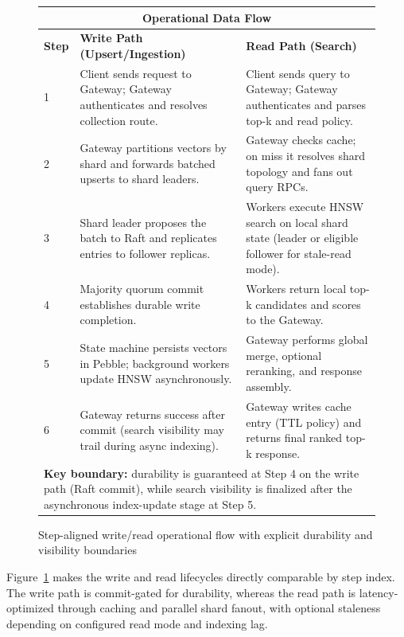 \documentclass[conference]{IEEEtran}
\begin{document}
\begin{figure}[t]
\centering
\footnotesize
\setlength{\tabcolsep}{5pt}
\renewcommand{\arraystretch}{1.20}
\begin{tabular}{|p{}|p{}|p{}|}
\hline
\multicolumn{3}{|c|}{\textbf{Operational Data Flow}} \\
\hline
\textbf{Step} & \textbf{Write Path (Upsert/Ingestion)} & \textbf{Read Path (Search)} \\
\hline
1 & Client sends request to Gateway; Gateway authenticates and resolves collection route. & Client sends query to Gateway; Gateway authenticates and parses top-k and read policy. \\
2 & Gateway partitions vectors by shard and forwards batched upserts to shard leaders. & Gateway checks cache; on miss it resolves shard topology and fans out query RPCs. \\
3 & Shard leader proposes the batch to Raft and replicates entries to follower replicas. & Workers execute HNSW search on local shard state (leader or eligible follower for stale-read mode). \\
4 & Majority quorum commit establishes durable write completion. & Workers return local top-k candidates and scores to the Gateway. \\
5 & State machine persists vectors in Pebble; background workers update HNSW asynchronously. & Gateway performs global merge, optional reranking, and response assembly. \\
6 & Gateway returns success after commit (search visibility may trail during async indexing). & Gateway writes cache entry (TTL policy) and returns final ranked top-k response. \\
\hline
\multicolumn{3}{|p{0.94\textwidth}|}{\textbf{Key boundary:} durability is guaranteed at Step 4 on the write path (Raft commit), while search visibility is finalized after the asynchronous index-update stage at Step 5.} \\
\hline
\end{tabular}
\caption{Step-aligned write/read operational flow with explicit durability and visibility boundaries}
\label{fig:dataflow}
\end{figure}

Figure~\ref{fig:dataflow} makes the write and read lifecycles directly comparable by step index. The write path is commit-gated for durability, whereas the read path is latency-optimized through caching and parallel shard fanout, with optional staleness depending on configured read mode and indexing lag.
\end{document}

